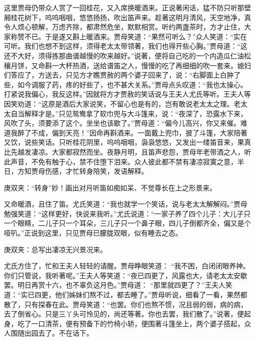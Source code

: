 \begin{parag}
    这里贾母仍带众人赏了一回桂花，又入席换暖酒来。正说著闲话，猛不防只听那壁厢桂花树下，呜呜咽咽，悠悠扬扬，吹出笛声来。趁著这明月清风，天空地净，真令人烦心顿解，万虑齐除，都肃然危坐，默默相赏。听约两盏茶时，方才止住，大家称赞不已。于是遂又斟上暖酒来。贾母笑道：“果然可听么？”众人笑道：“实在可听。我们也想不到这样，须得老太太带领著，我们也得开些心胸。”贾母道：“这还不大好，须得拣那曲谱越慢的吹来越好。”说著，便将自己吃的一个内造瓜仁油松穰月饼，又命斟一大杯热酒，送给谱笛之人，慢慢的吃了再细细的吹一套来。媳妇们答应了，方送去，只见方才瞧贾赦的两个婆子回来了，说：“右脚面上白肿了些，如今调服了药，疼的好些了，也不甚大关系。”贾母点头叹道：“我也太操心。打紧说我偏心，我反这样。”因就将方才贾赦的笑话说与王夫人尤氏等听。王夫人等因笑劝道：“这原是酒后大家说笑，不留心也是有的，岂有敢说老太太之理。老太太自当解释才是。”只见鸳鸯拿了软巾兜与大斗篷来，说：“夜深了，恐露水下来，风吹了头，须要添了这个。坐坐也该歇了。”贾母道：“偏今儿高兴，你又来催。难道我醉了不成，偏到天亮！”因命再斟酒来。一面戴上兜巾，披了斗篷，大家陪著又饮，说些笑话。只听桂花阴里，呜呜咽咽，袅袅悠悠，又发出一缕笛音来，果真比先越发凄凉。大家都寂然而坐。夜静月明，且笛声悲怨，贾母年老带酒之人，听此声音，不免有触于心，禁不住堕下泪来。众人彼此都不禁有凄凉寂寞之意，半日，方知贾母伤感，才忙转身陪笑，发语解释。\begin{note}庚双夹：“转身”妙！画出对月听笛如痴如呆、不觉尊长在上之形景来。\end{note}又命暖酒，且住了笛。尤氏笑道：“我也就学一个笑话，说与老太太解解闷。”贾母勉强笑道：“这样更好，快说来我听。”尤氏说道：“一家子养了四个儿子：大儿子只一个眼睛，二儿子只一个耳朵，三儿子只一个鼻子眼，四儿子倒都齐全，偏又是个哑叭。”正说到这里，只见贾母已朦胧双眼，似有睡去之态。\begin{note}庚双夹：总写出凄凉无兴景况来。\end{note}尤氏方住了，忙和王夫人轻轻的请醒。贾母睁眼笑道： “我不困，白闭闭眼养神。你们只管说，我听著呢。”王夫人等笑道：“夜已四更了，风露也大，请老太太安歇罢。明日再赏十六，也不辜负这月色。”贾母道： “那里就四更了？”王夫人笑道：“实已四更，他们姊妹们熬不过，都去睡了。”贾母听说，细看了一看，果然都散了，只有探春在此。贾母笑道：“也罢。你们也熬不惯，况且弱的弱，病的病，去了倒省心。只是三丫头可怜见的，尚还等著。你也去罢，我们散了。”说著，便起身，吃了一口清茶，便有预备下的竹椅小轿，便围著斗篷坐上，两个婆子搭起，众人围随出园去了。不在话下。
\end{parag}


